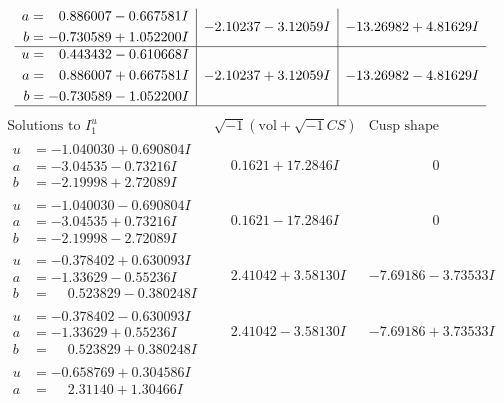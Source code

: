 \documentclass[1p]{elsarticle_modified}
\theoremstyle{definition}
\newcommand{\I}{\sqrt{-1}}
\begin{document}
$$\begin{array}{c|c|c}
\begin{aligned}
a &= \phantom{-}0.886007 - 0.667581 I \\
b &= -0.730589 + 1.052200 I\end{aligned}
 & -2.10237 - 3.12059 I & -13.26982 + 4.81629 I \\ \hline\begin{aligned}
u &= \phantom{-}0.443432 - 0.610668 I \\
a &= \phantom{-}0.886007 + 0.667581 I \\
b &= -0.730589 - 1.052200 I\end{aligned}
 & -2.10237 + 3.12059 I & -13.26982 - 4.81629 I\\
 \hline 
 \end{array}$$\newpage$$\begin{array}{c|c|c}  
\text{Solutions to }I^u_{1}& \I (\text{vol} + \sqrt{-1}CS) & \text{Cusp shape}\\
 \hline 
\begin{aligned}
u &= -1.040030 + 0.690804 I \\
a &= -3.04535 - 0.73216 I \\
b &= -2.19998 + 2.72089 I\end{aligned}
 & \phantom{-}0.1621 + 17.2846 I & \phantom{-0.000000 } 0 \\ \hline\begin{aligned}
u &= -1.040030 - 0.690804 I \\
a &= -3.04535 + 0.73216 I \\
b &= -2.19998 - 2.72089 I\end{aligned}
 & \phantom{-}0.1621 - 17.2846 I & \phantom{-0.000000 } 0 \\ \hline\begin{aligned}
u &= -0.378402 + 0.630093 I \\
a &= -1.33629 - 0.55236 I \\
b &= \phantom{-}0.523829 - 0.380248 I\end{aligned}
 & \phantom{-}2.41042 + 3.58130 I & -7.69186 - 3.73533 I \\ \hline\begin{aligned}
u &= -0.378402 - 0.630093 I \\
a &= -1.33629 + 0.55236 I \\
b &= \phantom{-}0.523829 + 0.380248 I\end{aligned}
 & \phantom{-}2.41042 - 3.58130 I & -7.69186 + 3.73533 I \\ \hline\begin{aligned}
u &= -0.658769 + 0.304586 I \\
a &= \phantom{-}2.31140 + 1.30466 I \\

\end{aligned}
\end{array}$$
\end{document}
